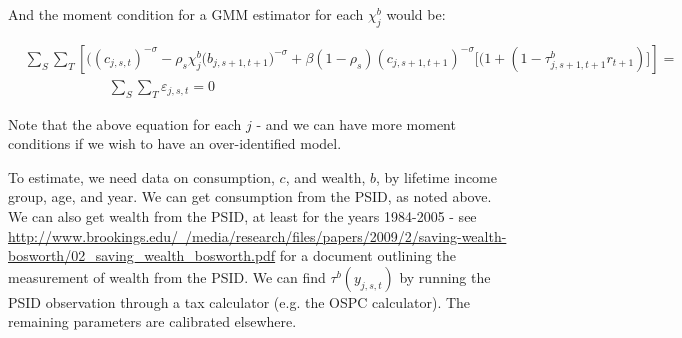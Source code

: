\documentclass[letterpaper,12pt]{article}
\theoremstyle{definition}
\begin{document}
And the moment condition for a GMM estimator for each $\chi^{b}_{j}$ would be:

  \begin{equation}\label{EqEulerLabGen}
      \begin{split}
        &\sum_{S}\sum_{T}\left[( (c_{j,s,t})^{-\sigma} - \rho_s\chi^b_j\bigl(b_{j,s+1,t+1}\bigr)^{-\sigma} + \beta(1-\rho_s)(c_{j,s+1,t+1})^{-\sigma}\Biggl[(1 + (1-\tau^{b}_{j,s+1,t+1}r_{t+1}) \Biggr]\right] = \\
        &    \quad\quad\quad\quad \quad \quad \sum_{S}\sum_{T}\varepsilon_{j,s,t}  = 0
        \end{split}
        \end{equation}
        
        Note that the above equation for each $j$ - and we can have more moment conditions if we wish to have an over-identified model. 
        
        To estimate, we need data on consumption, $c$, and wealth, $b$, by lifetime income group, age, and year.  We can get consumption from the PSID, as noted above.  We can also get wealth from the PSID, at least for the years 1984-2005 - see \href{http://www.brookings.edu/~/media/research/files/papers/2009/2/saving-wealth-bosworth/02\_saving\_wealth\_bosworth.pdf}{http://www.brookings.edu/~/media/research/files/papers/2009/2/saving-wealth-bosworth/02\_saving\_wealth\_bosworth.pdf} for a document outlining the measurement of wealth from the PSID.  We can find $\tau^{b}(y_{j,s,t})$ by running the PSID observation through a tax calculator (e.g. the OSPC calculator).  The remaining parameters are calibrated elsewhere.
        


   
    
\end{document}
